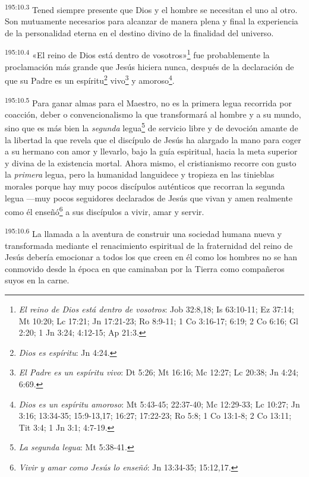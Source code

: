 \par 
\textsuperscript{195:10.3} Tened siempre presente que Dios y el hombre se necesitan el uno al otro. Son mutuamente necesarios para alcanzar de manera plena y final la experiencia de la personalidad eterna en el destino divino de la finalidad del universo.

\par 
\textsuperscript{195:10.4} «El reino de Dios está dentro de vosotros»\footnote{\textit{El reino de Dios está dentro de vosotros}: Job 32:8,18; Is 63:10-11; Ez 37:14; Mt 10:20; Lc 17:21; Jn 17:21-23; Ro 8:9-11; 1 Co 3:16-17; 6:19; 2 Co 6:16; Gl 2:20; 1 Jn 3:24; 4:12-15; Ap 21:3.} fue probablemente la proclamación más grande que Jesús hiciera nunca, después de la declaración de que su Padre es un espíritu\footnote{\textit{Dios es espíritu}: Jn 4:24.} vivo\footnote{\textit{El Padre es un espíritu vivo}: Dt 5:26; Mt 16:16; Mc 12:27; Lc 20:38; Jn 4:24; 6:69.} y amoroso\footnote{\textit{Dios es un espíritu amoroso}: Mt 5:43-45; 22:37-40; Mc 12:29-33; Lc 10:27; Jn 3:16; 13:34-35; 15:9-13,17; 16:27; 17:22-23; Ro 5:8; 1 Co 13:1-8; 2 Co 13:11; Tit 3:4; 1 Jn 3:1; 4:7-19.}.

\par 
\textsuperscript{195:10.5} Para ganar almas para el Maestro, no es la primera legua recorrida por coacción, deber o convencionalismo la que transformará al hombre y a su mundo, sino que es más bien la \textit{segunda} legua\footnote{\textit{La segunda legua}: Mt 5:38-41.} de servicio libre y de devoción amante de la libertad la que revela que el discípulo de Jesús ha alargado la mano para coger a su hermano con amor y llevarlo, bajo la guía espiritual, hacia la meta superior y divina de la existencia mortal. Ahora mismo, el cristianismo recorre con gusto la \textit{primera} legua, pero la humanidad languidece y tropieza en las tinieblas morales porque hay muy pocos discípulos auténticos que recorran la segunda legua ---muy pocos seguidores declarados de Jesús que vivan y amen realmente como él enseñó\footnote{\textit{Vivir y amar como Jesús lo enseñó}: Jn 13:34-35; 15:12,17.} a sus discípulos a vivir, amar y servir.

\par 
\textsuperscript{195:10.6} La llamada a la aventura de construir una sociedad humana nueva y transformada mediante el renacimiento espiritual de la fraternidad del reino de Jesús debería emocionar a todos los que creen en él como los hombres no se han conmovido desde la época en que caminaban por la Tierra como compañeros suyos en la carne.

